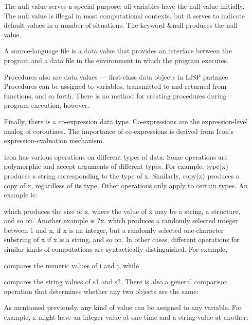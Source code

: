 The null value serves a special purpose; all variables have the null value initially. The null value is illegal in most
computational contexts, but it serves to indicate default values in a number of situations. The keyword \&null produces
the null value.

A source-language file is a data value that provides an interface
between the program and a data file in the environment in which the
program executes.

Procedures also are data values --- {\textquotedbl}first-class data
objects{\textquotedbl} in LISP parlance.  Procedures can be assigned
to variables, transmitted to and returned from functions, and so
forth. There is no method for creating procedures during program
execution, however.

Finally, there is a co-expression data type. Co-expressions are the
expression-level analog of coroutines. The importance of
co-expressions is derived from Icon's expression-evaluation mechanism.

Icon has various operations on different types of data. Some
operations are polymorphic and accept arguments of different
types. For example, type(x) produces a string corresponding to the
type of x. Similarly, copy(x) produces a copy of x, regardless of its
type. Other operations only apply to certain types. An example is:



\noindent which produces the size of x, where the value of x may be a
string, a structure, and so on. Another example is ?x, which produces
a randomly selected integer between 1 and x, if x is an integer, but a
randomly selected one-character substring of x if x is a string, and
so on. In other cases, different operations for similar kinds of
computations are syntactically distinguished. For example,


\noindent compares the numeric values of i and j, while


\noindent compares the string values of s1 and s2. There is also a
general comparison operation that determines whether any two objects
are the same:



As mentioned previously, any kind of value can be assigned to any
variable. For example, x might have an integer value at one time and a
string value at another:

